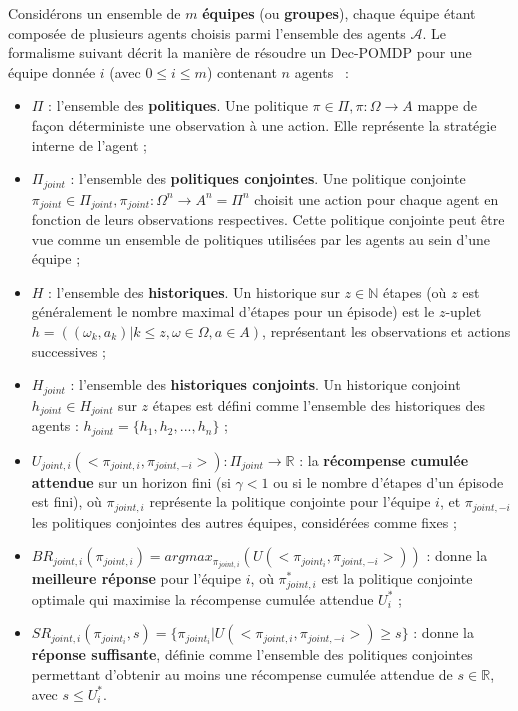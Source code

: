\documentclass[sigconf,anonymous]{aamas}
\begin{document}
Considérons un ensemble de $m$ \textbf{équipes} (ou \textbf{groupes}), chaque équipe étant composée de plusieurs agents choisis parmi l'ensemble des agents $\mathcal{A}$. Le formalisme suivant décrit la manière de résoudre un Dec-POMDP pour une équipe donnée $i$ (avec $0 \leq i \leq m$) contenant $n$ agents~\citep{Beynier2013,Albrecht2024} :

\begin{itemize}
    \item $\Pi$ : l'ensemble des \textbf{politiques}. Une politique $\pi \in \Pi, \pi: \Omega \rightarrow A$ mappe de façon déterministe une observation à une action. Elle représente la stratégie interne de l'agent ;
    \item $\Pi_{joint}$ : l'ensemble des \textbf{politiques conjointes}. Une politique conjointe $\pi_{joint} \in \Pi_{joint}, \pi_{joint}: \Omega^n \rightarrow A^n = \Pi^n$ choisit une action pour chaque agent en fonction de leurs observations respectives. Cette politique conjointe peut être vue comme un ensemble de politiques utilisées par les agents au sein d'une équipe ;
    \item $H$ : l'ensemble des \textbf{historiques}. Un historique sur $z \in \mathbb{N}$ étapes (où $z$ est généralement le nombre maximal d'étapes pour un épisode) est le $z$-uplet $h = ((\omega_{k}, a_{k}) | k \leq z, \omega \in \Omega, a \in A)$, représentant les observations et actions successives ;
    \item $H_{joint}$ : l'ensemble des \textbf{historiques conjoints}. Un historique conjoint $h_{joint} \in H_{joint}$ sur $z$ étapes est défini comme l'ensemble des historiques des agents : $h_{joint} = \{h_1, h_2, ..., h_n\}$ ;
    \item $U_{joint,i}(<\pi_{joint,i}, \pi_{joint,-i}>): \Pi_{joint} \rightarrow \mathbb{R}$ : la \textbf{récompense cumulée attendue} sur un horizon fini (si $\gamma < 1$ ou si le nombre d'étapes d'un épisode est fini), où $\pi_{joint,i}$ représente la politique conjointe pour l'équipe $i$, et $\pi_{joint,-i}$ les politiques conjointes des autres équipes, considérées comme fixes ;
    \item $BR_{joint,i}(\pi_{joint,i}) = argmax_{\pi_{joint,i}}(U(<\pi_{joint_i}, \pi_{joint,-i}>))$ : donne la \textbf{meilleure réponse} pour l'équipe $i$, où $\pi_{joint,i}^*$ est la politique conjointe optimale qui maximise la récompense cumulée attendue $U_i^*$ ;
    \item $SR_{joint,i}(\pi_{joint_i}, s) = \{\pi_{joint_i} | U(<\pi_{joint,i}, \pi_{joint,-i}>) \geq s\}$ : donne la \textbf{réponse suffisante}, définie comme l'ensemble des politiques conjointes permettant d'obtenir au moins une récompense cumulée attendue de $s \in \mathbb{R}$, avec $s \leq U_i^*$.
\end{itemize}
\end{document}

